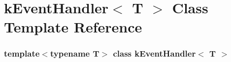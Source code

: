 \hypertarget{classk_event_handler}{\section{k\-Event\-Handler$<$ \-T $>$ \-Class \-Template \-Reference}
\label{classk_event_handler}
}
\subsubsection*{template$<$typename \-T$>$ class k\-Event\-Handler$<$ T $>$}

